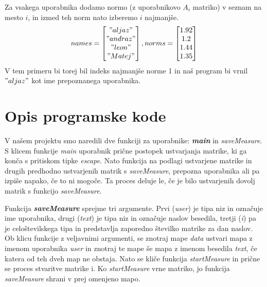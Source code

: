 \documentclass[12pt]{article}
\begin{document}
Za vsakega uporabnika dodamo normo (z uporabnikovo $A_i$ matriko) v seznam na mesto $i$, in izmed teh norm nato izberemo
$i$ najmanjše.  
\[
  names = \begin{bmatrix}
    "aljaz"\\
    "andraz"\\
    "leon"\\
    "Matej"
  \end{bmatrix},
  norms = \begin{bmatrix}
    1.92\\
    1.2\\
    1.44\\
    1.35
  \end{bmatrix}
\]
V tem primeru bi torej bil indeks najmanjše norme 1 in naš program bi vrnil $"aljaz"$ kot ime prepoznanega uporabnika.

\section{Opis programske kode}
V našem projektu smo naredili dve funkciji za uporabnike: \textbf{\textit{main}} in \textit{saveMeasure}. 
S klicem funkcije \textit{main} uporabnik prične postopek ustvarjanja matrike, ki ga konča s pritiskom 
tipke \textit{escape}. Nato funkcija na podlagi ustvarjene matrike in drugih predhodno ustvarjenih matrik s 
\textit{saveMeasure}, prepozna uporabnika ali pa izpiše napako, če to ni mogoče. Ta proces deluje le, če je bilo 
ustvarjenih dovolj matrik s funkcijo \textit{saveMeasure}.

Funkcija \textbf{\textit{saveMeasure}} sprejme tri argumente. 
Prvi (\textit{user}) je tipa niz in označuje ime uporabnika, drugi (\textit{text}) je tipa niz in označuje naslov 
besedila, tretji (\textit{i}) pa je celoštevilskega tipa in predstavlja zaporedno številko matrike za dan naslov. 
Ob klicu funkcije z veljavnimi argumenti, se znotraj mape \textit{data} ustvari mapa z imenom uporabnika \textit{user} 
in znotraj te mape še mapa z imenom besedila \textit{text}, če katera od teh dveh map ne obstaja. 
Nato se kliče funkcija \textit{startMeasure} in prične se proces stvaritve matrike i. Ko \textit{startMeasure} 
vrne matriko, jo funkcija\textit{ saveMeasure} shrani v prej omenjeno mapo.
\end{document}
